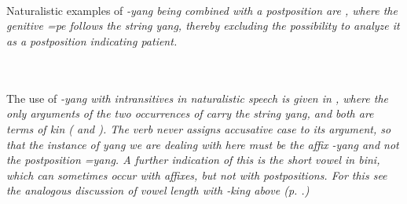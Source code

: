 \\ 

\\

\\


Naturalistic examples of \em -yang \em being combined with a postposition are  , where the genitive \em =pe \em follows the string \em yang\em, thereby excluding the possibility to analyze it as a postposition indicating patient.

 \\
 \\
The use of \em -yang \em with intransitives in naturalistic speech is given in , where the only arguments of the two occurrences of  carry the string \em yang\em, and both are terms of kin ( and ). The verb  never assigns accusative case to its argument, so that the instance of \em yang \em we are dealing with here must be the affix \em -yang \em and not the postposition \em =yang\em. A further indication of this is the short vowel in \em bini\em, which can sometimes occur with affixes, but not with postpositions. For this see the analogous discussion of vowel length with \em -king \em above (p. \pageref{page:morph:king}.)
 
